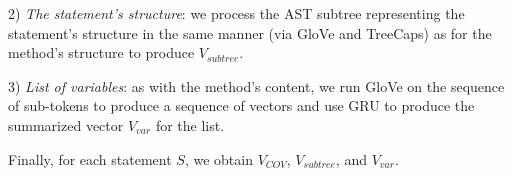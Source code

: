 



2) {\em The statement's structure}: we process the AST
subtree representing the statement's structure in the same manner (via
GloVe and TreeCaps) as for the method's structure to produce
$V_{subtree}$.



3) {\em List of variables}: as with the method's content,
we run GloVe on the sequence of sub-tokens to produce a sequence of
vectors and use GRU to produce the summarized vector $V_{var}$ for the
list.


Finally, for each statement $S$, we obtain $V_{COV}$, $V_{subtree}$, and
$V_{var}$.






